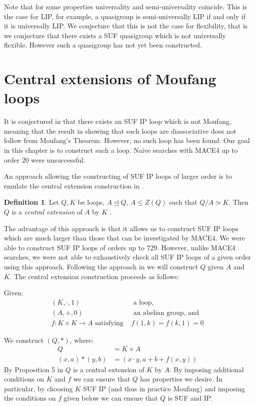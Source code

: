 \documentclass[12pt, twoside, openright]{report}
\theoremstyle{definition}
\newtheorem{dfn}[thm]{Definition}
\newcommand{\rdv}{/}                %
\begin{document}
Note that for some properties universality and semi-universality coincide. This is the case for LIP,
  for example, a quasigroup is semi-universally LIP if and only if it is universally LIP. We conjecture that
  this is not the case for flexibility, that is we conjecture that there exists a SUF quasigroup
  which is not universally flexible. However such a quasigroup has not yet been constructed.

\section{Central extensions of Moufang loops}

It is conjectured in \cite{SUF} that there exists an SUF IP loop which is not Moufang, meaning that
  the result in \cite{SUF} showing that such loops are diassociative does not follow from Moufang's
  Theorem. However, no such loop has been found. Our goal in this chapter is to construct such a loop.
  Naive searches with MACE4 up to order $20$ were unsuccessful.

An approach allowing the constructing of SUF IP loops of larger order is to emulate the central
  extension construction in \cite{64and81}.

\begin{dfn}
  Let $Q, K$ be loops, $A\unlhd Q$, $A\leq Z(Q)$ such that $Q\rdv A\simeq K$. Then $Q$ is
    a \emph{central extension} of $A$ by $K$ \cite{64and81}.
\end{dfn}

The advantage of this approach is that it allows us to construct SUF IP loops which are much
  larger than those that can be investigated by MACE4. We were able to construct SUF IP loops
  of orders up to $729$. However, unlike MACE4 searches, we were not able to exhaustively check
  all SUF IP loops of a given order using this approach. Following the approach in \cite{64and81}
  we will construct $Q$ given $A$ and $K$. The central extension construction proceeds as follows:

Given:
  \begin{align*}
    (K, \cdot, 1) &\text{ a loop,}\\
    (A, +, 0) &\text{ an abelian group, and}\\
    f:K\times K\to A\text{ satisfying } &f(1, k) = f(k, 1) = 0 
  \end{align*}

We construct $(Q, *)$, where:
  \begin{align*}
    Q  &= K\times A\\
    (x, a)*(y, b) &= (x\cdot y, a + b + f(x, y))
  \end{align*}
By Proposition 5 in \cite{64and81} $Q$ is a central extension of $K$ by $A$. By imposing additional
  conditions on $K$ and $f$ we can ensure that $Q$ has properties we desire. In particular, by
  choosing $K$ SUF IP (and thus in practice Moufang) and imposing the conditions on $f$ given below
  we can ensure that $Q$ is SUF and IP.
\end{document}
